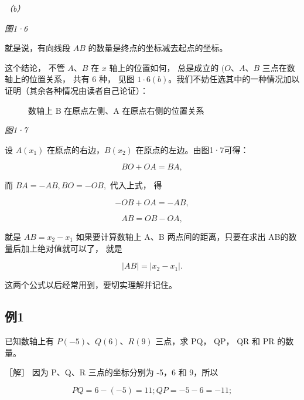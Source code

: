 \emph{（b）}

\emph{图1·6}

就是说，有向线段 \(AB\) 的数量是终点的坐标减去起点的坐标。

这个结论， 不管 \(A \text{、} B\) 在 \(x\) 轴上的位置如何， 总是成立的
\((O \text{、} A \text{、} B\) 三点在数轴上的位置关系， 共有 6 种， 见图
\(1 \cdot 6(b)\)。我们不妨任选其中的一种情况加以证明（其余各种情况由读者自己论证）：

\begin{figure}
\centering
{}
\caption{数轴上 B 在原点左侧、A 在原点右侧的位置关系}
\end{figure}

\emph{图1·7}

设 \(A(x_{1})\) 在原点的右边，\(B(x_{2})\) 在原点的左边。由图1·7可得：

\[
BO + OA = BA,
\]

而 \(BA = -AB, BO = -OB,\) 代入上式， 得

\[
- OB + OA = - AB,
\]

\[
AB = OB - OA,
\]

就是 \(\boxed{AB=x_{2}-x_{1}}\) 如果要计算数轴上 A、B
两点间的距离，只要在求出 AB的数量后加上绝对值就可以了， 就是

\[
| AB | = \left| x_{2} - x_{1} \right|.
\]

这两个公式以后经常用到，要切实理解并记住。

\subsection{例1}\label{ux4f8b1}

已知数轴上有 \(P(-5)\)、\(Q(6)\)、\(R(9)\) 三点，求 PQ， QP， QR 和 PR
的数量。

［解］ 因为 P、Q、R 三点的坐标分别为 -5，6 和 9，所以

\[
PQ = 6 - (- 5) = 11; QP = - 5 - 6 = - 11;
\]

